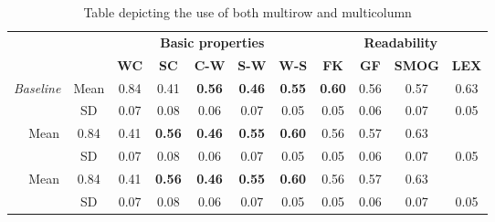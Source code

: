 \documentclass[14pt]{extarticle}
\begin{document}
\begin{table}[h!]
  \begin{center}
    \caption{Table depicting the use of both multirow and multicolumn}
    \label{tab:table1}
    \begin{tabular}{ccc|c|c|c|c|c|c|c|c|c|}\cline{4-12} 
      \multicolumn{3}{c}{\multirow{2}{*}{}} &
      \multicolumn{5}{|c|}{\textbf{Basic properties}} & \multicolumn{4}{|c|}{\textbf{Readability}}\\\cline{4-12}
      \multicolumn{3}{c|}{} & \textbf{WC} & \textbf{SC} & \textbf{C-W} & \textbf{S-W} & \textbf{W-S} & \textbf{FK} & \textbf{GF} & \textbf{SMOG} & \textbf{LEX}\\
      \hline
      \multicolumn{2}{|c|}{\multirow{2}{*}{\parbox{2cm}{\textit{Baseline}}}} & Mean & 0.84 & 0.41 & \textbf{0.56} & \textbf{0.46} & \textbf{0.55} & \textbf{0.60} & 0.56 & 0.57 & 0.63 \\\cline{3-12}
       \multicolumn{2}{|c|}{} & SD & 0.07 & 0.08 & 0.06 & 0.07 & 0.05 & 0.05 & 0.06 & 0.07 & 0.05 \\
      \hhline{============}
      
      \multicolumn{2}{|c|}{\multirow{2}{*}{\parbox{2.5cm}{$ScaComp_h$}}} & Mean & 0.84 & 0.41 & \textbf{0.56} & \textbf{0.46} & \textbf{0.55} & \textbf{0.60} & 0.56 & 0.57 & 0.63 \\\cline{3-12}
       \multicolumn{2}{|c|}{} & SD & 0.07 & 0.08 & 0.06 & 0.07 & 0.05 & 0.05 & 0.06 & 0.07 & 0.05 \\
      \hhline{============}
      
      \multicolumn{2}{|c|}{\multirow{2}{*}{\parbox{2.5cm}{$ScaComp_l$}}} & Mean & 0.84 & 0.41 & \textbf{0.56} & \textbf{0.46} & \textbf{0.55} & \textbf{0.60} & 0.56 & 0.57 & 0.63 \\\cline{3-12}
       \multicolumn{2}{|c|}{} & SD & 0.07 & 0.08 & 0.06 & 0.07 & 0.05 & 0.05 & 0.06 & 0.07 & 0.05 \\
      \hline
    \end{tabular}
  \end{center}
\end{table}
\end{document}
